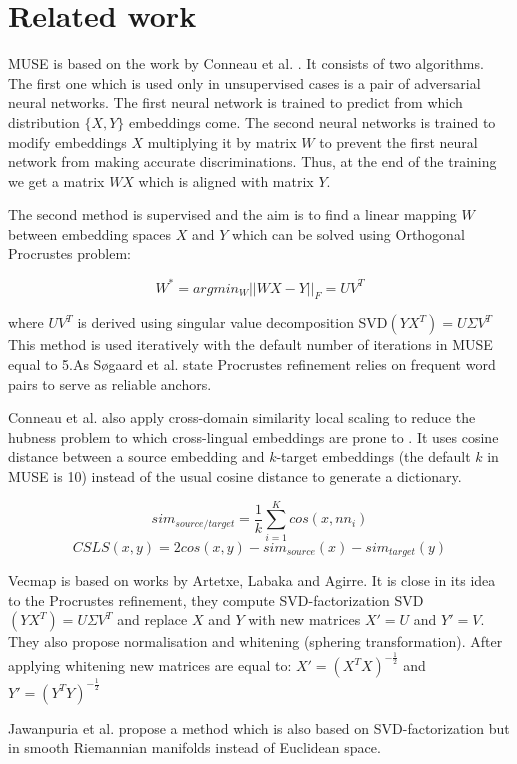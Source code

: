 \documentclass[conference]{IEEEtran}
\begin{document}
\section{Related work}

MUSE is based on the work by Conneau et al. \cite{muse}. It consists of two algorithms. The first one which is used only in unsupervised cases is a pair of adversarial neural networks. The first neural network is trained to predict from which distribution $\{X, Y\}$ embeddings come. The second neural networks is trained to modify embeddings $X$ multiplying it by matrix $W$ to prevent the first neural network from making accurate discriminations. Thus, at the end of the training we get a matrix $WX$ which is aligned with matrix $Y$.

The second method is supervised and the aim is to find a linear mapping $W$ between embedding spaces $X$ and $Y$ which can be solved using Orthogonal Procrustes problem:

$$ W^* = argmin_W ||WX - Y||_F = UV^T$$

where $UV^T$ is derived using singular value decomposition SVD$(YX^T) = U \Sigma V^T$
This method is used iteratively with the default number of iterations in MUSE equal to 5.As Søgaard et al. state Procrustes refinement relies on frequent word pairs to serve as reliable anchors.

Conneau et al. also apply cross-domain similarity local scaling to reduce the hubness problem to which cross-lingual embeddings are prone to \cite{dinu}. It uses cosine distance between a source embedding and $k$-target embeddings (the default $k$ in MUSE is 10) instead of the usual cosine distance to generate a dictionary.

$$sim_{source/target} = \dfrac{1}{k}\sum_{i=1}^Kcos(x, nn_i)$$
$$CSLS(x,y) = 2cos(x,y) - sim_{source}(x)  - sim_{target}(y)$$

Vecmap is based on works by Artetxe, Labaka and Agirre. It is close in its idea to the Procrustes refinement, they compute SVD-factorization SVD$(YX^T) = U\Sigma V^T$ and replace $X$ and $Y$ with new matrices $X' = U$ and $Y' = V$. They also propose normalisation and whitening (sphering transformation). After applying whitening new matrices are equal to:
$X' = (X^TX)^{-\tfrac{1}{2}}$ and $Y' = (Y^TY)^{-\tfrac{1}{2}}$

Jawanpuria et al. \cite{jawanpuria} propose a method which is also based on SVD-factorization but in smooth Riemannian manifolds instead of Euclidean space.
\end{document}
